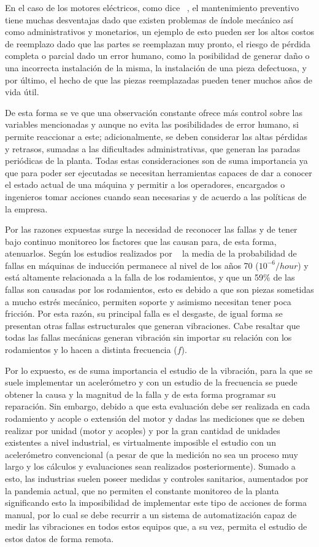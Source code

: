 En el caso de los motores eléctricos, como dice ~\textcite{Lacey}, el
mantenimiento preventivo tiene muchas desventajas dado que existen problemas de
índole mecánico así como administrativos y monetarios, un ejemplo de esto
pueden ser los altos costos de reemplazo dado que las partes se reemplazan muy
pronto, el riesgo de pérdida completa o parcial dado un error humano, como la posibilidad
de generar daño o una incorrecta instalación de la misma, la instalación de una
pieza defectuosa, y por último, el hecho de que las piezas reemplazadas
pueden tener muchos años de vida útil.

De esta forma se ve que una observación constante ofrece más control sobre las
variables mencionadas y aunque no evita las posibilidades de error humano, si
permite reaccionar a este; adicionalmente, se deben considerar las altas
pérdidas y retrasos, sumadas a las dificultades administrativas, que generan
las paradas periódicas de la planta. Todas estas consideraciones son de suma
importancia ya que para poder ser ejecutadas se necesitan herramientas capaces de
dar a conocer el estado actual de una máquina y permitir a los operadores,
encargados o ingenieros tomar acciones cuando sean necesarias y de acuerdo a
las políticas de la empresa.

Por las razones expuestas surge la necesidad de reconocer las fallas y de tener
bajo continuo monitoreo los factores que las causan para, de esta forma,
atenuarlos. Según los estudios realizados por ~\textcite{Kammermann} la media
de la probabilidad de fallas en máquinas de inducción permanece al nivel de los
años 70 ($10^{-6}/hour$) y está altamente relacionada a la falla de los
rodamientos, y que un 59\% de las fallas son causadas por los rodamientos, esto
es debido a que son piezas sometidas a mucho estrés mecánico, permiten soporte
y asimismo necesitan tener poca fricción. Por esta razón, su principal falla es
el desgaste, de igual forma se presentan otras fallas estructurales que generan
vibraciones. Cabe resaltar que todas las fallas mecánicas generan vibración sin
importar su relación con los rodamientos y lo hacen a distinta frecuencia
($f$).

Por lo expuesto, es de suma importancia el estudio de la vibración, para la que
se suele implementar un acelerómetro y con un estudio de la frecuencia se puede
obtener la causa y la magnitud de la falla y de esta forma programar su
reparación. Sin embargo, debido a que esta evaluación debe ser realizada en
cada rodamiento y acople o extensión del motor  y dadas las mediciones que se
deben realizar por unidad (motor y acoples) y por la gran cantidad de unidades
existentes a nivel industrial, es virtualmente imposible el estudio con un
acelerómetro convencional (a pesar de que la medición no sea un proceso muy
largo y los cálculos y evaluaciones sean realizados posteriormente). Sumado a
esto, las industrias suelen poseer medidas y controles sanitarios, aumentados
por la pandemia actual, que no permiten el constante monitoreo de la planta
significando esto la imposibilidad de implementar este tipo de acciones de
forma manual, por lo cual se debe recurrir a un sistema de automatización capaz
de medir las vibraciones en todos estos equipos que, a su vez, permita el
estudio de estos datos de forma remota.
